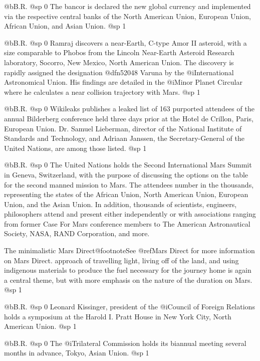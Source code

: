@b{B.R.}
@sp 0
The bancor is declared the new global currency and implemented via the respective central banks of the North American Union, European Union, African Union, and Asian Union.
@sp 1

@b{B.R.}
@sp 0
Ramraj discovers a near-Earth, C-type Amor II asteroid, with a size comparable to Phobos from the Lincoln Near-Earth Asteroid Research laboratory, Socorro, New Mexico, North American Union. The discovery is rapidly assigned the designation @dfn{52048 Varuna} by the @i{International Astronomical Union}. His findings are detailed in the @i{Minor Planet Circular} where he calculates a near collision trajectory with Mars.
@sp 1

@b{B.R.}
@sp 0
Wikileaks publishes a leaked list of 163 purported attendees of the annual Bilderberg conference held three days prior at the Hotel de Crillon, Paris, European Union. Dr. Samuel Lieberman, director of the National Institute of Standards and Technology, and Adriaan Janssen, the Secretary-General of the United Nations, are among those listed.
@sp 1

@b{B.R.}
@sp 0
The United Nations holds the Second International Mars Summit in Geneva, Switzerland, with the purpose of discussing the options on the table for the second manned mission to Mars. The attendees number in the thousands, representing the states of the African Union, North American Union, European Union, and the Asian Union. In addition, thousands of scientists, engineers, philosophers attend and present either independently or with associations ranging from former Case For Mars conference members to The American Astronautical Society, NASA, RAND Corporation, and more.

The minimalistic Mars Direct@footnote{See @ref{Mars Direct} for more information on Mars Direct.} approach of travelling light, living off of the land, and using indigenous materials to produce the fuel necessary for the journey home is again a central theme, but with more emphasis on the nature of the duration on Mars.
@sp 1

@b{B.R.}
@sp 0
Leonard Kissinger, president of the @i{Council of Foreign Relations} holds a symposium at the Harold I. Pratt House in New York City, North American Union.
@sp 1

@b{B.R.}
@sp 0
The @i{Trilateral Commission} holds its biannual meeting several months in advance, Tokyo, Asian Union.
@sp 1

